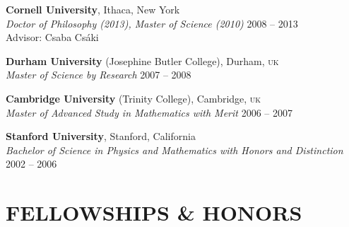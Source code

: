 \documentclass[margin,line]{resume}
\newcommand{\mydate}{}
\newcommand{\scap}[1]{\textsc{\MakeLowercase{#1}}}
\begin{document}
\begin{resume}
\textbf{Cornell University}, Ithaca, New York \\
\textsl{Doctor of Philosophy (2013), Master of Science (2010)} 
\hfill 
{\mydate 
2008 -- 2013
}\vspace{-3mm}\\

\vspace{-1.5em}
\noindent Advisor: Csaba Cs\'aki

\vspace{-1.7mm}


\textbf{Durham University} (Josephine Butler College), Durham, \scap{UK} \\
\textsl{Master of Science by Research} 
\hfill 
{\mydate 
2007 -- 2008
}\vspace{-1.7mm}


\textbf{Cambridge University} (Trinity College), Cambridge, \scap{UK} \\
\textsl{Master of Advanced Study in Mathematics with Merit} 
\hfill 
{\mydate 
2006 -- 2007
}\vspace{-3mm}\\
\vspace{-1mm}
\vspace{-1.7mm}


\textbf{Stanford University}, Stanford, California \\
\textsl{Bachelor of Science in Physics and Mathematics with Honors and Distinction} 
\hfill 
{\mydate 
2002 -- 2006
}\vspace{-3mm}\\
\vspace{-1mm}
\vspace{-.5mm}



\section{\footnotesize \sc
\sffamily 
{}
FELLOWSHIPS \& HONORS
}


\end{resume}
\end{document}
